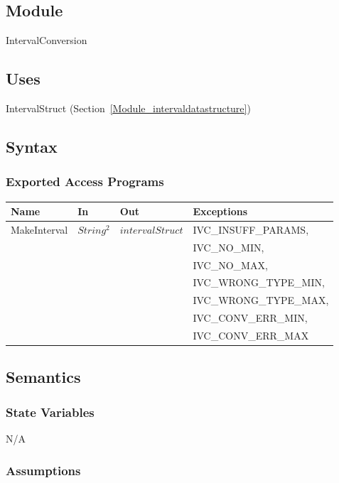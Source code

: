 \documentclass[12pt, titlepage]{article}
\begin{document}
\subsection{Module}

IntervalConversion

\subsection{Uses}

IntervalStruct (Section~\ref{Module_intervaldatastructure})

\subsection{Syntax}

\subsubsection{Exported Access Programs}

\begin{center}
	\begin{tabular}{p{3cm} p{4cm} p{4cm} p{2cm}}
		\hline
		\textbf{Name} & \textbf{In} & \textbf{Out} & \textbf{Exceptions} \\
		\hline
		\multirow{6}{3cm}{MakeInterval} & \multirow{6}{3cm}{$String^2$} & 
		\multirow{6}{3cm}{$intervalStruct$} & IVC\_INSUFF\_PARAMS, \\
		& & & IVC\_NO\_MIN, \\
		& & & IVC\_NO\_MAX,\\
		& & & IVC\_WRONG\_TYPE\_MIN, \\
		& & & IVC\_WRONG\_TYPE\_MAX,\\
		& & & IVC\_CONV\_ERR\_MIN, \\
		& & & IVC\_CONV\_ERR\_MAX \\
		\hline
	\end{tabular}
\end{center}

\subsection{Semantics}

\subsubsection{State Variables}

N/A

\subsubsection{Assumptions}
\end{document}
